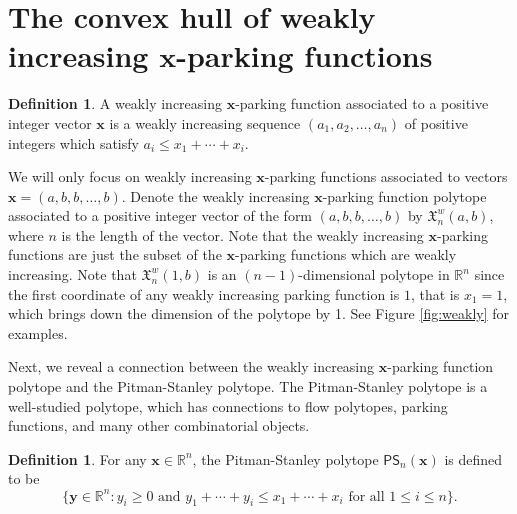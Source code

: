 \documentclass[11pt]{amsart}
\theoremstyle{definition}
\newtheorem{definition}[theorem]{Definition}
\newcommand{\0}{\emptyset}
\newcommand{\R}{\mathbb{R}}
\newcommand{\bx}{\mathbf{x}}
\newcommand{\X}{\mathfrak{X}}
\newcommand{\by}{\mathbf{y}}
\begin{document}

\section{The convex hull of weakly increasing \texorpdfstring{$\mathbf{x}$}{\textbf{x}}-parking functions}\label{sec:weakly_increasing}

\begin{definition}
A weakly increasing $\mathbf{x}$-parking function associated to a positive integer vector $\mathbf{x}$  is a weakly increasing sequence $(a_1, a_2, \ldots, a_n)$ of positive integers which satisfy $a_i \leq x_1+\cdots+x_i$.
\end{definition}

We will only focus on weakly increasing $\mathbf{x}$-parking functions associated to vectors $\mathbf{x} = (a,b,b, \ldots, b)$. Denote the weakly increasing $\mathbf{x}$-parking function polytope associated to a positive integer vector of the form $(a,b,b,\ldots, b)$ by $\X_{n}^w(a,b)$, where $n$ is the length of the vector. Note that the weakly increasing $\mathbf{x}$-parking functions are just the subset of the $\mathbf{x}$-parking functions which are weakly increasing.
Note that $\X^w_n (1,b)$ is an $(n-1)$-dimensional polytope in $\R^n$ since the first coordinate of any weakly increasing parking function is $1$, that is $x_1=1$, which brings down the dimension of the polytope by 1. See Figure \ref{fig:weakly} for examples.

Next, we reveal a connection between the weakly increasing $\bx$-parking function polytope and the Pitman-Stanley polytope.
The Pitman-Stanley polytope is a well-studied polytope, which has connections to flow polytopes, parking functions, and many other combinatorial objects. 

\begin{definition}
    For any $\bx\in \R^n$, the Pitman-Stanley polytope $\mathsf{PS}_n(\bx) $ is defined to be \[\{\by \in \R^n : y_i \geq 0 \text{ and } y_1+\cdots + y_i \leq x_1 + \cdots + x_i \text{ for all } 1\leq i \leq n\}.\]
\end{definition}
\end{document}
